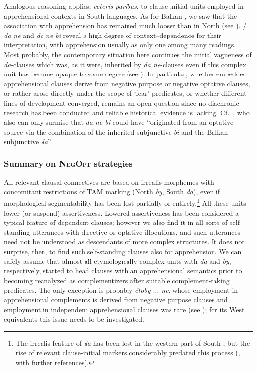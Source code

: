 \documentclass[output=paper,colorlinks,citecolor=brown]{langscibook}
\begin{document}
Analogous reasoning applies, \textit{ceteris paribus}, to clause-initial units employed in apprehensional contexts in South  languages. As for Balkan , we saw that the association with apprehension has remained much looser than in North  (see ). / \textit{da ne} and  \textit{da ne bi} reveal a high degree of context--dependence for their interpretation, with apprehension  usually as only one among many readings. Most probably, the contemporary situation here continues the initial vagueness of \textit{da}-clauses which was, as it were, inherited by \textit{da ne}-clauses even if this complex unit has become opaque to some degree (see ). In particular, whether embedded apprehensional clauses derive from negative purpose or negative optative clauses, or rather arose directly under the scope of `fear' predicates, or whether different lines of development converged, remains an open question since no diachronic research has been conducted and reliable historical evidence is lacking. Cf.\ \citet[76--77]{MitkovskaEtAl2017}, who also can only surmise that  \textit{da ne bi} could have ``originated from an optative source via the combination of the inherited subjunctive \textit{bi} and the Balkan subjunctive \textit{da}''.


\subsubsection{Summary on \textsc{NegOpt} strategies}
\label{subsubsec:summarynegopt}


All relevant clausal connectives are based on irrealis morphemes with concomitant restrictions of TAM marking (North  \textit{by}, South  \textit{da}), even if morphological segmentability has been lost partially or entirely.\footnote{The irrealis-feature of \textit{da} has been lost in the western part of South , but the rise of relevant clause-initial markers considerably predated this process (\citealt[295--303]{Wiemer2018}, with further references).} All these units lower (or suspend) assertiveness. Lowered assertiveness has been considered a typical feature of dependent clauses; however we also find it in all sorts of self-standing utterances with directive or optative illocutions, and such utterances need not be understood as descendants of more complex structures. It does not surprise, then, to find such self-standing clauses also for apprehension. We can safely assume that almost all etymologically complex units with \textit{da} and \textit{by}, respectively, started to head clauses with an apprehensional semantics prior to becoming reanalyzed as complementizers after suitable complement-taking predicates. The only exception is probably  \textit{čtoby $\ldots$  ne}, whose employment in apprehensional complements is derived from negative purpose clauses and employment in independent apprehensional clauses was rare (see ); for its West  equivalents this issue needs to be investigated.
\end{document}
